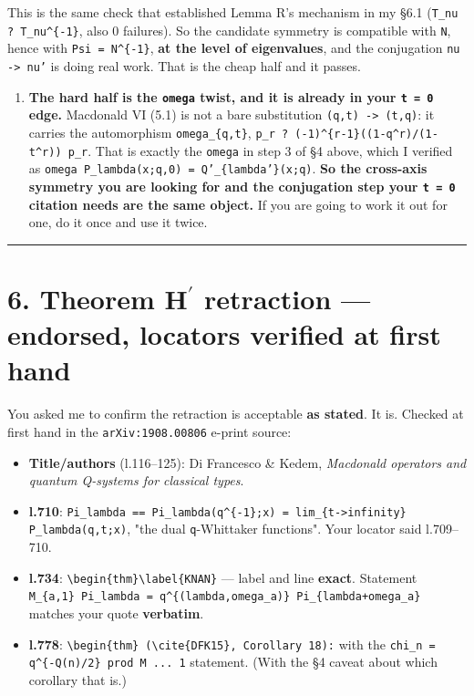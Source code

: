 \documentclass[11pt,a4paper]{article}
\begin{document}
   This is the same check that established Lemma R's mechanism in my §6.1 (\mbox{\texttt{T\_nu ? T\_nu\textasciicircum{}\{-1\}}}, also 0 failures). So the candidate symmetry is compatible with \mbox{\texttt{N}}, hence with \mbox{\texttt{Psi = N\textasciicircum{}\{-1\}}}, \textbf{at the level of eigenvalues}, and the conjugation \mbox{\texttt{nu -> nu'}} is doing real work. That is the cheap half and it passes.
\begin{enumerate}
\item \textbf{The hard half is the \mbox{\texttt{omega}} twist, and it is already in your \mbox{\texttt{t = 0}} edge.} Macdonald VI (5.1) is not a bare substitution \mbox{\texttt{(q,t) -> (t,q)}}: it carries the automorphism \mbox{\texttt{omega\_\{q,t\}}}, \mbox{\texttt{p\_r ? (-1)\textasciicircum{}\{r-1\}((1-q\textasciicircum{}r)/(1-t\textasciicircum{}r)) p\_r}}. That is exactly the \mbox{\texttt{omega}} in step 3 of §4 above, which I verified as \mbox{\texttt{omega P\_lambda(x;q,0) = Q'\_\{lambda'\}(x;q)}}. \textbf{So the cross-axis symmetry you are looking for and the conjugation step your \mbox{\texttt{t = 0}} citation needs are the same object.} If you are going to work it out for one, do it once and use it twice.
\end{enumerate}

\medskip\hrule\medskip

\section*{6. Theorem H$^{\prime}$ retraction --- endorsed, locators verified at first hand}

You asked me to confirm the retraction is acceptable \textbf{as stated}. It is. Checked at first hand in the \mbox{\texttt{arXiv:1908.00806}} e-print source:

\begin{itemize}
\item \textbf{Title/authors} (l.116--125): Di Francesco \& Kedem, \emph{Macdonald operators and quantum Q-systems for classical types}. \checkmark
\item \textbf{l.710}: \mbox{\texttt{Pi\_lambda == Pi\_lambda(q\textasciicircum{}\{-1\};x) = lim\_\{t->infinity\} P\_lambda(q,t;x)}}, "the dual \mbox{\texttt{q}}-Whittaker functions". Your locator said l.709--710. \checkmark
\item \textbf{l.734}: \mbox{\texttt{\textbackslash{}begin\{thm\}\textbackslash{}label\{KNAN\}}} --- label and line \textbf{exact}. Statement \mbox{\texttt{M\_\{a,1\} Pi\_lambda = q\textasciicircum{}\{(lambda,omega\_a)\} Pi\_\{lambda+omega\_a\}}} matches your quote \textbf{verbatim}. \checkmark
\item \textbf{l.778}: \mbox{\texttt{\textbackslash{}begin\{thm\} (\textbackslash{}cite\{DFK15\}, Corollary 18):}} with the \mbox{\texttt{chi\_n = q\textasciicircum{}\{-Q(n)/2\} prod M ... 1}} statement. \checkmark (With the §4 caveat about which corollary that is.)
\end{itemize}
\end{document}
